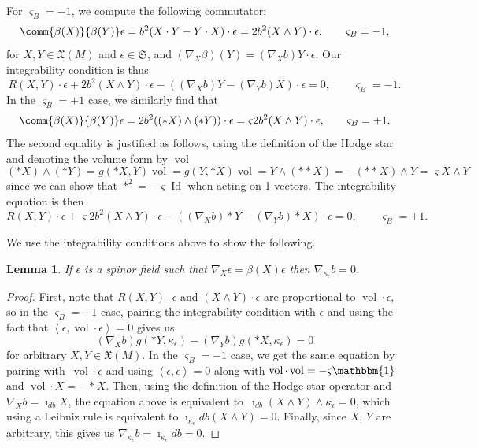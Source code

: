 \documentclass[10pt,a4paper]{amsart}
\numberwithin{equation}{section}
\newtheorem{Lemma}[Theorem]{Lemma}
\newcommand{\fX}{\mathfrak{X}}
\newcommand{\fS}{\mathfrak{S}}
\newcommand{\1}{\mathbbm{1}}
\newcommand{\pair}[2]{\left\langle #1,#2\right\rangle} %
\DeclareMathOperator{\Id}{Id}
\DeclareMathOperator{\vol}{vol}
\begin{document}
For $\varsigma_B=-1$, we compute the following commutator:
\[
	\comm{\beta(X)}{\beta(Y)}\epsilon = b^2 (X\cdot Y - Y\cdot X)\cdot \epsilon = 2b^2 (X\wedge Y)\cdot \epsilon,
	\qquad \varsigma_B = -1,
\]
for $X,Y\in\fX(M)$ and $\epsilon\in\fS$, and $(\nabla_X\beta)(Y)=(\nabla_X b) Y\cdot \epsilon$. Our integrability condition is thus
\[%
	R(X,Y)\cdot \epsilon + 2b^2 (X\wedge Y)\cdot \epsilon - ((\nabla_X b) Y - (\nabla_Y b) X)\cdot \epsilon = 0,
	\qquad \varsigma_B = -1.
\]
In the $\varsigma_B=+1$ case, we similarly find that
\[
	\comm{\beta(X)}{\beta(Y)}\epsilon = 2b^2 ((*X)\wedge (*Y))\cdot \epsilon = \varsigma 2b^2 (X\wedge Y)\cdot \epsilon,
		\qquad \varsigma_B = +1.
\]
The second equality is justified as follows, using the definition of the Hodge star and denoting the volume form by $\vol$
\[
	(*X)\wedge (*Y) = g(*X,Y)\vol = g(Y,*X)\vol = Y\wedge (**X) = -(**X)\wedge Y = \varsigma X\wedge Y
\]
since we can show that $*^2=-\varsigma \Id$ when acting on 1-vectors. The integrability equation is then
\[%
	R(X,Y)\cdot \epsilon + \varsigma 2b^2 (X\wedge Y)\cdot \epsilon - ((\nabla_X b) *Y - (\nabla_Y b) *X)\cdot \epsilon = 0,
	\qquad \varsigma_B = +1.
\]

We use the integrability conditions above to show the following.

\begin{Lemma}\label{lemma:2d-dirac-current-preserve-beta}
	If $\epsilon$ is a spinor field such that $\nabla_X\epsilon=\beta(X)\epsilon$ then $\nabla_{\kappa_\epsilon} b = 0$.
\end{Lemma}

\begin{proof}
	First, note that $R(X,Y)\cdot\epsilon$ and $(X\wedge Y)\cdot\epsilon$ are proportional to $\vol\cdot\epsilon$, so in the $\varsigma_B=+1$ case, pairing the integrability condition with $\epsilon$ and using the fact that $\pair{\epsilon}{\vol\cdot\epsilon} = 0$ gives us
	\[
		(\nabla_X b)g(*Y,\kappa_\epsilon) - (\nabla_Y b)g(*X,\kappa_\epsilon) = 0
	\]
	for arbitrary $X,Y\in\fX(M)$. In the $\varsigma_B=-1$ case, we get the same equation by pairing with~${\vol\cdot\epsilon}$ and using $\pair{\epsilon}{\epsilon}=0$ along with $\vol\cdot\vol = -\varsigma\1$ and $\vol\cdot X = -*X$. Then, using the definition of the Hodge star operator and $\nabla_X b = \imath_{db}X$, the equation above is equivalent to~${\imath_{db}(X\wedge Y)\wedge\kappa_\epsilon = 0}$,
	which using a Leibniz rule is equivalent to $\imath_{\kappa_\epsilon}db(X\wedge Y) = 0$. Finally, since $X$, $Y$ are arbitrary, this gives us $\nabla_{\kappa_\epsilon}b=\imath_{\kappa_\epsilon}db=0$.
\end{proof}
\end{document}
